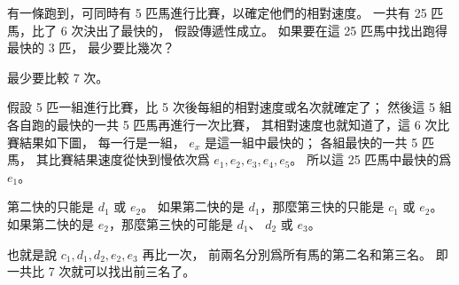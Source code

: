 
\startEXERCISE
有一條跑到，可同時有 5 匹馬進行比賽，以確定他們的相對速度。
一共有 25 匹馬，比了 6 次決出了最快的，
假設傳遞性成立。
如果要在這 25 匹馬中找出跑得最快的 3 匹，
最少要比幾次？
\stopEXERCISE

\startANSWER
最少要比較 7 次。

假設 5 匹一組進行比賽，比 5 次後每組的相對速度或名次就確定了；
然後這 5 組各自跑的最快的一共 5 匹馬再進行一次比賽，
其相對速度也就知道了，這 6 次比賽結果如下圖，
每一行是一組， $e_x$ 是這一組中最快的；
各組最快的一共 5 匹馬，
其比賽結果速度從快到慢依次爲 $e_1,e_2,e_3,e_4,e_5$。
所以這 25 匹馬中最快的爲 $e_1$。

\externalfigure[e9_1_3-1]

第二快的只能是 $d_1$ 或 $e_2$。
如果第二快的是 $d_1$，那麼第三快的只能是 $c_1$ 或 $e_2$。
如果第二快的是 $e_2$，那麼第三快的可能是 $d_1$、 $d_2$ 或 $e_3$。

也就是說 $c_1,d_1,d_2,e_2,e_3$ 再比一次，
前兩名分別爲所有馬的第二名和第三名。
即一共比 7 次就可以找出前三名了。


\stopANSWER
